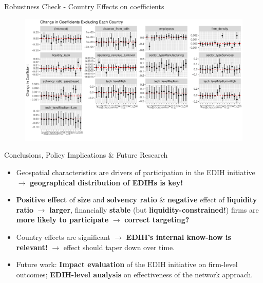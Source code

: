 \documentclass{beamer}
\begin{document}
\begin{frame}{Robustness Check - Country Effects on coefficients}
    \begin{figure}
        \centering
        \includegraphics[width=1\textwidth]{../Output/changes-in-coeff-nocountryeffects-LEGACY.pdf}
    \end{figure}
\end{frame}

\begin{frame}{Conclusions, Policy Implications \& Future Research}

    \begin{itemize}
        \item Geospatial characteristics are drivers of participation in the EDIH initiative $\to$ \textbf{geographical distribution of EDIHs is key!}
        \item \textbf{Positive effect} of \textbf{size} and \textbf{solvency ratio} \& \textbf{negative} effect of \textbf{liquidity ratio} $\to$ \textbf{larger}, financially \textbf{stable} (but \textbf{liquidity-constrained!}) firms are \textbf{more likely to participate} $\to$ \textbf{correct targeting?}
        \item Country effects are significant $\to$ \textbf{EDIH's internal know-how is relevant!} $\to$ effect should taper down over time.
        \item Future work: \textbf{Impact evaluation} of the EDIH initiative on firm-level outcomes; \textbf{EDIH-level analysis} on effectiveness of the network approach.
    \end{itemize}
\end{frame}
\end{document}

